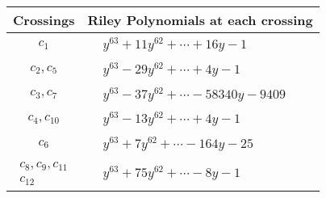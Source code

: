 \documentclass[1p]{elsarticle_modified}
\theoremstyle{definition}
\begin{document}
\begin{tabular}{m{50pt}|m{274pt}}
Crossings & \hspace{64pt}Riley Polynomials at each crossing \\
\hline $$\begin{aligned}c_{1}\end{aligned}$$&$\begin{aligned}
&y^{63}+11 y^{62}+\cdots+16 y-1
\end{aligned}$\\
\hline $$\begin{aligned}c_{2},c_{5}\end{aligned}$$&$\begin{aligned}
&y^{63}-29 y^{62}+\cdots+4 y-1
\end{aligned}$\\
\hline $$\begin{aligned}c_{3},c_{7}\end{aligned}$$&$\begin{aligned}
&y^{63}-37 y^{62}+\cdots-58340 y-9409
\end{aligned}$\\
\hline $$\begin{aligned}c_{4},c_{10}\end{aligned}$$&$\begin{aligned}
&y^{63}-13 y^{62}+\cdots+4 y-1
\end{aligned}$\\
\hline $$\begin{aligned}c_{6}\end{aligned}$$&$\begin{aligned}
&y^{63}+7 y^{62}+\cdots-164 y-25
\end{aligned}$\\
\hline $$\begin{aligned}c_{8},c_{9},c_{11}\\c_{12}\end{aligned}$$&$\begin{aligned}
&y^{63}+75 y^{62}+\cdots-8 y-1
\end{aligned}$\\
\hline
\end{tabular}
\vskip 2pc
\end{document}
